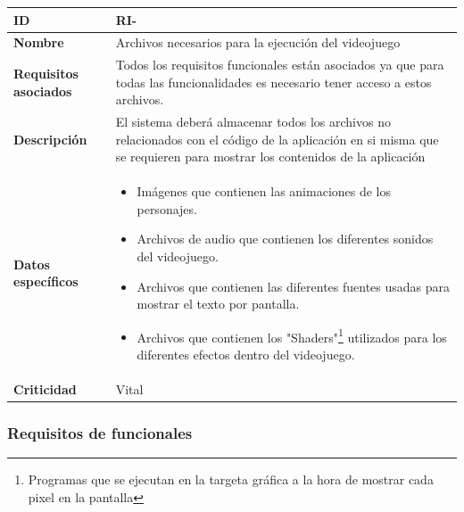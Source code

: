 \begin{center}
	\begin{tabular}{ | p{4.5cm} | p{10cm} | } 
		\hline
		
		\textbf{ID} & RI-\arabic{contador_requisitos_de_informacion}
		{contador_requisitos_de_informacion} \\
		
		\hline 
		
		\textbf{Nombre} &
		Archivos necesarios para la ejecución del videojuego\\ 
		
		\hline
		
		\textbf{Requisitos asociados} & 
		Todos los requisitos funcionales están asociados ya que para todas las funcionalidades es necesario tener acceso a estos archivos.\\
		
		\hline
		
		\textbf{Descripción} & 
		El sistema deberá almacenar todos los archivos no relacionados con el código de la aplicación en si misma que se requieren para mostrar los contenidos de la aplicación\\
		
		\hline 
		
		\textbf{Datos específicos} &
		\begin{itemize}
			\item Imágenes que contienen las animaciones de los personajes.
			\item Archivos de audio que contienen los diferentes sonidos del videojuego.
			\item Archivos que contienen las diferentes fuentes usadas para mostrar el texto por pantalla.
			\item Archivos que contienen los "Shaders"\footnote{Programas que se ejecutan en la targeta gráfica a la hora de mostrar cada pixel en la pantalla} utilizados para los diferentes efectos dentro del videojuego.
		\end{itemize}\\
		
		\hline 
		
		\textbf{Criticidad} &
		Vital\\
		
		\hline
	\end{tabular}
\end{center}



\subsubsection{Requisitos de funcionales}

